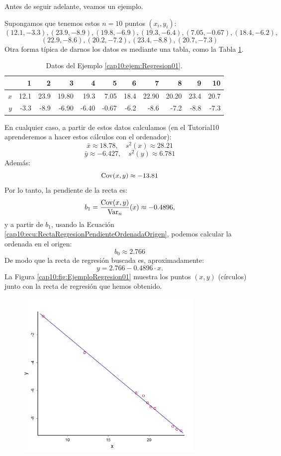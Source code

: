 \noindent Antes de seguir adelante, veamos un ejemplo.
\begin{ejemplo}\label{cap10:ejem:Regresion01}
Supongamos que tenemos estos $n=10$ puntos $(x_i,y_i)$:
\[(12.1,-3.3),(23.9,-8.9),(19.8,-6.9),(19.3,-6.4),(7.05,-0.67),(18.4,-6.2),\]
\[(22.9,-8.6),(20.2,-7.2),(23.4,-8.8),(20.7,-7.3)\]
Otra forma típica de darnos los datos es mediante una tabla, como la Tabla \ref{cap10:tabla:EjemploRegresion01}.
\begin{table}[ht]
\centering
\begin{tabular}{rrrrrrrrrrr}
  \hline
 & 1 & 2 & 3 & 4 & 5 & 6 & 7 & 8 & 9 & 10 \\
  \hline
$x$ & 12.1 & 23.9 & 19.80 & 19.3 & 7.05 & 18.4 & 22.90 & 20.20 & 23.4 & 20.7 \\
$y$ & -3.3 & -8.9 & -6.90 & -6.40 & -0.67 & -6.2 & -8.6 & -7.2 & -8.8 & -7.3 \\
   \hline
\end{tabular}
\caption{Datos del Ejemplo \ref{cap10:ejem:Regresion01}.}
\label{cap10:tabla:EjemploRegresion01}
\end{table}
En cualquier caso, a partir de estos datos calculamos (en el Tutorial10 aprenderemos a hacer estos cálculos con el ordenador):
\[
\bar x \approx 18.78
,\quad
s^2(x)\approx 28.21
\]
\[
\bar y \approx -6.427
,\quad
s^2(y)\approx 6.781
\]
Además:
\[\mathrm{Cov}(x,y)\approx -13.81\]
Por lo tanto, la pendiente de la recta es:
\[b_1=\dfrac{\mathrm{Cov}(x,y)}{\operatorname{Var}_n}(x)\approx -0.4896,\]
y a partir de $b_1$, usando la Ecuación \ref{cap10:ecu:RectaRegresionPendienteOrdenadaOrigen}, podemos calcular la ordenada en el origen:
\[b_0 \approx 2.766 \]
De modo que la recta de regresión buscada es, aproximadamente:
\[y = 2.766-0.4896\cdot x.\]
La Figura \ref{cap10:fig:EjemploRegresion01} muestra los puntos $(x,y)$ (círculos) junto con la recta de regresión que hemos obtenido.
\begin{figure}[htbp]
\begin{center}
\begin{enColor}
\includegraphics[width=9cm]{../fig/Cap10-EjemploRegresion01.png}

\end{enColor}
\end{center}
\end{figure}
\end{ejemplo}
